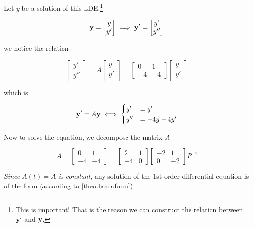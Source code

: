 	\begin{sol}
		Let $y$ be a solution of this LDE.\footnote{This is important! That is the reason we can construct the relation between $\bm{\mathrm{y}}'$ and $\bm{\mathrm{y}}$.}

		\[\bm{\mathrm{y}} = \begin{bmatrix}
			y\\y'
		\end{bmatrix} \implies \bm{\mathrm{y}}' = \begin{bmatrix}
			y'\\y''
		\end{bmatrix}\]

		we notice the relation

		\[\begin{bmatrix}
			y'\\y''
		\end{bmatrix} = A \begin{bmatrix}
			y\\y'
		\end{bmatrix} = \begin{bmatrix}
			0&1\\-4&-4
		\end{bmatrix} \begin{bmatrix}
			y\\y'
		\end{bmatrix}\]

		which is
		
		\[\bm{\mathrm{y}}' = A \bm{\mathrm{y}} \iff \begin{cases}
			y' &= y'\\
			y'' &= -4y - 4y'
		\end{cases}\]
		
		Now to solve the equation, we decompose the matrix $A$

		\begin{equation} \label{eq:hldepjp}
			A = \begin{bmatrix}
				0&1\\-4&-4
			\end{bmatrix} = \begin{bmatrix}
				2&1\\-4&0
			\end{bmatrix} \begin{bmatrix}
				-2&1\\0&-2
			\end{bmatrix} P^{-1}
		\end{equation}

		\textit{Since $A(t) = A$ is constant}, any solution of the 1st order differential equation is of the form (according to \cref*{theo:homoform})


\end{sol}
